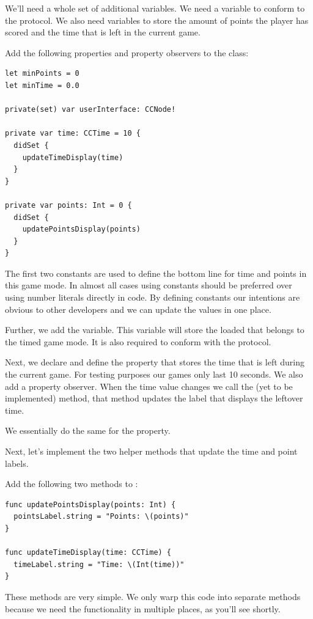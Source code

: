We'll need a whole set of additional variables. We need a
 variable to conform to the
 protocol. We also need variables to store the amount of
points the player has scored and the time that is left in the current game.

\begin{leftbar}
Add the following properties and property observers to the
 class:
\begin{lstlisting}
let minPoints = 0
let minTime = 0.0

private(set) var userInterface: CCNode!

private var time: CCTime = 10 {
  didSet {
    updateTimeDisplay(time)
  }
}

private var points: Int = 0 {
  didSet {
    updatePointsDisplay(points)
  }
}
\end{lstlisting}
\end{leftbar}
The first two constants are used to define the bottom line for time and points
in this game mode. In almost all cases using constants should be preferred over
using number literals directly in code. By defining constants our intentions are
obvious to other developers and we can update the values in one place.

Further, we add the  variable. This variable will
store the loaded \ccbfile{} that belongs to the timed game mode. It is also
required to conform with the  protocol.

Next, we declare and define the  property that stores the time
that is left during the current game. For testing purposes our games only last 10 seconds. We
also add a property observer. When the time value changes we call the (yet to
be implemented)  method, that method updates the
label that displays the leftover time.

We essentially do the same for the  property.

Next, let's implement the two helper methods that update the time and point
labels.
\begin{leftbar}
Add the following two methods to :
\begin{lstlisting}
func updatePointsDisplay(points: Int) {
  pointsLabel.string = "Points: \(points)"
}

func updateTimeDisplay(time: CCTime) {
  timeLabel.string = "Time: \(Int(time))"
}
\end{lstlisting}
\end{leftbar}
These methods are very simple. We only warp this code into separate methods
because we need the functionality in multiple places, as you'll see shortly.

